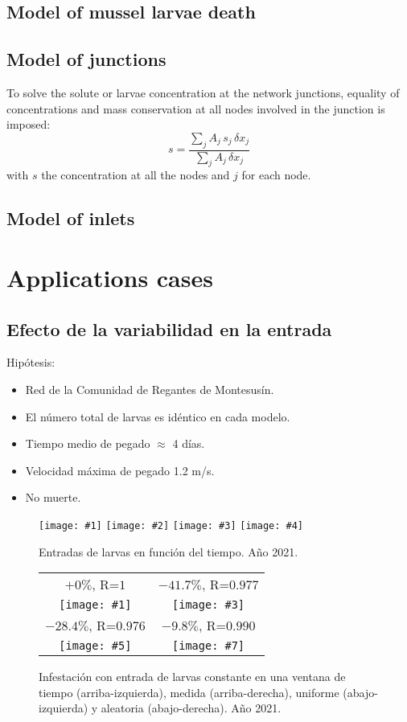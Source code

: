 \documentclass[review,authoryear]{elsarticle}
\newcommand{\EQ}[2]{\begin{equation}#1\label{#2}\end{equation}}
\newcommand{\FIGIV}[6]
{
	\begin{figure}[ht!]
		\centering
		\texttt{[image: \#1]}
		\texttt{[image: \#2]}
		\texttt{[image: \#3]}
		\texttt{[image: \#4]}
		\caption{#5.\label{#6}}
	\end{figure}
}
\newcommand{\FIGIVB}[9]
{
	\begin{figure}[ht!]
		\centering
		\begin{tabular}{cc}
			#2&#4\\
			\texttt{[image: \#1]}&
			\texttt{[image: \#3]}\\
			#6&#8\\
			\texttt{[image: \#5]}&
			\texttt{[image: \#7]}
		\end{tabular}
		\caption{#9.}
	\end{figure}
}
\begin{document}
\subsection{Model of mussel larvae death}

\subsection{Model of junctions}

To solve the solute or larvae concentration at the network junctions, equality
of concentrations and mass conservation at all nodes involved in the junction is
imposed:
\EQ{s=\frac{\sum_jA_j\,s_j\,\delta x_j}{\sum_jA_j\,\delta x_j}}{EqJunction}
with $s$ the concentration at all the nodes and $j$ for each node.

\subsection{Model of inlets}

\section{Applications cases}

\subsection{Efecto de la variabilidad en la entrada}

Hipótesis:
\begin{itemize}
\item Red de la Comunidad de Regantes de Montesusín.
\item El número total de larvas es idéntico en cada modelo.
\item Tiempo medio de pegado $\approx$ 4 días.
\item Velocidad máxima de pegado 1.2 m/s.
\item No muerte.
\end{itemize}

\FIGIV{2021-mussel-input-constant.eps}{2021-mussel-input-measured.eps}
{2021-mussel-input-uniform.eps}{2021-mussel-input-random.eps}
{Entradas de larvas en función del tiempo. Año 2021}{Fig2021MusselInput}

\FIGIVB{2021-mussel-constant.pdf}{$+0\%$, R=$1$}
{2021-mussel-measured.pdf}{$-41.7\%$, R=$0.977$}
{2021-mussel-uniform.pdf}{$-28.4\%$, R=$0.976$}
{2021-mussel-random.pdf}{$-9.8\%$, R=$0.990$}
{Infestación con entrada de larvas constante en una ventana de tiempo
(arriba-izquierda), medida (arriba-derecha), uniforme (abajo-izquierda) y
aleatoria (abajo-derecha). Año 2021\label{Fig2021MusselRandom}}
\end{document}
